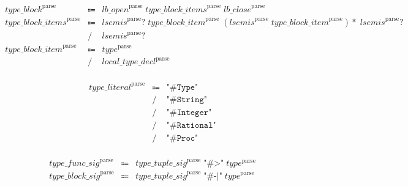 \begin{align*}
    \begin{array}{rcll}
        \mathit{type\_block}^\mathrm{parse}
        &\Coloneq &\mathit{lb\_open}^\mathrm{parse}\; \mathit{type\_block\_items}^\mathrm{parse}\; \mathit{lb\_close}^\mathrm{parse} \\
        \mathit{type\_block\_items}^\mathrm{parse}
        &\Coloneq &\mathit{lsemis}^\mathrm{parse}{?}\; \mathit{type\_block\_item}^\mathrm{parse}\; (\mathit{lsemis}^\mathrm{parse}\; \mathit{type\_block\_item}^\mathrm{parse}){*}\; \mathit{lsemis}^\mathrm{parse}{?} \\
        &\mathrel{/} &\mathit{lsemis}^\mathrm{parse}{?} \\
        \mathit{type\_block\_item}^\mathrm{parse}
        &\Coloneq &\mathit{type}^\mathrm{parse} \\
        &\mathrel{/} &\mathit{local\_type\_decl}^\mathrm{parse}
    \end{array}
\end{align*}

\begin{align*}
    \begin{array}{rcll}
        \mathit{type\_literal}^\mathrm{parse}
        &\Coloneq &\texttt{"\#Type"} \\
        &\mathrel{/} &\texttt{"\#String"} \\
        &\mathrel{/} &\texttt{"\#Integer"} \\
        &\mathrel{/} &\texttt{"\#Rational"} \\
        &\mathrel{/} &\texttt{"\#Proc"}
    \end{array}
\end{align*}

\begin{align*}
    \begin{array}{rcll}
        \mathit{type\_func\_sig}^\mathrm{parse}
        &\Coloneq &\mathit{type\_tuple\_sig}^\mathrm{parse}\; \texttt{"\#>"}\; \mathit{type}^\mathrm{parse} \\
        \mathit{type\_block\_sig}^\mathrm{parse}
        &\Coloneq &\mathit{type\_tuple\_sig}^\mathrm{parse}\; \texttt{"\#-|"}\; \mathit{type}^\mathrm{parse}
    \end{array}
\end{align*}

